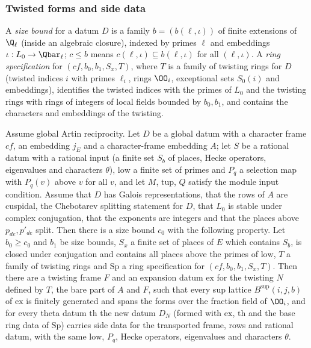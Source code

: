 \subsubsection{Twisted forms and side data}

A \emph{size bound} for a datum $D$ is a family $b=(b(\ell,\iota))$ of finite extensions of $\Q_\ell$ (inside an
algebraic closure), indexed by primes $\ell$ and embeddings $\iota:L_0\to\Qbar_\ell$; $c\le b$ means
$c(\ell,\iota)\subseteq b(\ell,\iota)$ for all $(\ell,\iota)$. A \emph{ring specification} for $(cf,b_0,b_1,S_x,T)$,
where $T$ is a family of twisting rings for $D$ (twisted indices $i$ with primes $\ell_i$, rings $\OO_i$,
exceptional sets $S_0(i)$ and embeddings), identifies the twisted indices with the primes of $L_0$ and the
twisting rings with rings of integers of local fields bounded by $b_0,b_1$, and contains the characters and
embeddings of the twisting.

\begin{theorem}\label{pf:baselat2:secondstep}
Assume global Artin reciprocity. Let $D$ be a global datum with a character frame $cf$, an embedding $j_E$ and
a character-frame embedding $A$; let $S$ be a rational datum with a rational input (a finite set $S_b$ of
places, Hecke operators, eigenvalues and characters $\theta$), $\mathrm{low}$ a finite set of primes and $P_q$ a
selection map with $P_q(v)$ above $v$ for all $v$, and let $M$, $\mathrm{tup}$, $Q$ satisfy the module input
condition. Assume that $D$ has Galois representations, that the rows of $A$ are cuspidal, the Chebotarev
splitting statement for $D$, that $L_0$ is stable under complex conjugation, that the exponents are
integers and that the places above $p_{de},p'_{de}$ split. Then there is a size bound $c_0$ with the following
property. Let $b_0\ge c_0$ and $b_1$ be size bounds, $S_x$ a finite set of places of $E$ which contains $S_b$,
is closed under conjugation and contains all places above the primes of $\mathrm{low}$, $T$ a family of
twisting rings and $\mathrm{Sp}$ a ring specification for $(cf,b_0,b_1,S_x,T)$. Then there are a twisting frame
$F$ and an expansion datum $\mathrm{ex}$ for the twisting $N$ defined by $T$, the bare part of $A$ and $F$, such
that every sup lattice $B^{\sup}(i,j,b)$ of $\mathrm{ex}$ is finitely generated and spans the forms over the
fraction field of $\OO_i$, and for every theta datum $\mathrm{th}$ the new datum $D_N$ (formed with $\mathrm{ex}$,
$\mathrm{th}$ and the base ring data of $\mathrm{Sp}$) carries side data for the transported frame, rows and
rational datum, with the same $\mathrm{low}$, $P_q$, Hecke operators, eigenvalues and characters $\theta$.
\end{theorem}

